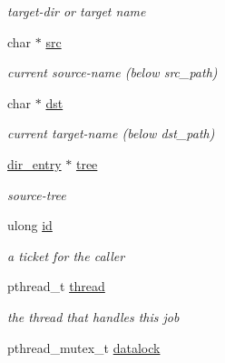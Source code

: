 \begin{CompactItemize}
\begin{CompactList}\small\item\em target-dir or target name \item\end{CompactList}\item 
\hypertarget{struct__noir__job_o18}{
char $\ast$ \hyperlink{struct__noir__job_o18}{src}}
\label{struct__noir__job_o18}

\begin{CompactList}\small\item\em current source-name (below src\_\-path) \item\end{CompactList}\item 
\hypertarget{struct__noir__job_o19}{
char $\ast$ \hyperlink{struct__noir__job_o19}{dst}}
\label{struct__noir__job_o19}

\begin{CompactList}\small\item\em current target-name (below dst\_\-path) \item\end{CompactList}\item 
\hypertarget{struct__noir__job_o20}{
\hyperlink{struct__dir__entry}{dir\_\-entry} $\ast$ \hyperlink{struct__noir__job_o20}{tree}}
\label{struct__noir__job_o20}

\begin{CompactList}\small\item\em source-tree \item\end{CompactList}\item 
\hypertarget{struct__noir__job_o21}{
ulong \hyperlink{struct__noir__job_o21}{id}}
\label{struct__noir__job_o21}

\begin{CompactList}\small\item\em a ticket for the caller \item\end{CompactList}\item 
\hypertarget{struct__noir__job_o22}{
pthread\_\-t \hyperlink{struct__noir__job_o22}{thread}}
\label{struct__noir__job_o22}

\begin{CompactList}\small\item\em the thread that handles this job \item\end{CompactList}\item 
\hypertarget{struct__noir__job_o23}{
pthread\_\-mutex\_\-t \hyperlink{struct__noir__job_o23}{datalock}}
\label{struct__noir__job_o23}


\end{CompactItemize}
